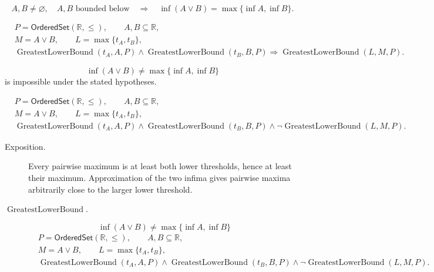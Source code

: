 \begin{remark*}
\[
A,B\neq\varnothing,\quad A,B\text{ bounded below}
\quad\Longrightarrow\quad
\inf(A\vee B)=\max\{\inf A,\inf B\}.
\]
\end{remark*}

\begin{remark*}
\[
\begin{aligned}
&P=\mathsf{OrderedSet}(\mathbb{R},\leq),\qquad A,B\subseteq\mathbb{R},\\
&M=A\vee B,\qquad L=\max\{t_A,t_B\},\\
&\operatorname{GreatestLowerBound}(t_A,A,P)\land\operatorname{GreatestLowerBound}(t_B,B,P)
\Longrightarrow
\operatorname{GreatestLowerBound}(L,M,P).
\end{aligned}
\]
\end{remark*}

\begin{remark*}
\[
\inf(A\vee B)\neq\max\{\inf A,\inf B\}
\]
is impossible under the stated hypotheses.
\end{remark*}

\begin{remark*}
\[
\begin{aligned}
&P=\mathsf{OrderedSet}(\mathbb{R},\leq),\qquad A,B\subseteq\mathbb{R},\\
&M=A\vee B,\qquad L=\max\{t_A,t_B\},\\
&\operatorname{GreatestLowerBound}(t_A,A,P)\land\operatorname{GreatestLowerBound}(t_B,B,P)\land
\neg\operatorname{GreatestLowerBound}(L,M,P).
\end{aligned}
\]
\end{remark*}

\begin{remark*}
\begin{description}
\item[Exposition.]
Every pairwise maximum is at least both lower thresholds, hence at least their
maximum.  Approximation of the two infima gives pairwise maxima arbitrarily
close to the larger lower threshold.


  \item[\(\operatorname{GreatestLowerBound}.\)]
  \[
\inf(A\vee B)\neq\max\{\inf A,\inf B\}
\]
\[
\begin{aligned}
&P=\mathsf{OrderedSet}(\mathbb{R},\leq),\qquad A,B\subseteq\mathbb{R},\\
&M=A\vee B,\qquad L=\max\{t_A,t_B\},\\
&\operatorname{GreatestLowerBound}(t_A,A,P)\land\operatorname{GreatestLowerBound}(t_B,B,P)\land
\neg\operatorname{GreatestLowerBound}(L,M,P).
\end{aligned}
\]
\end{description}
\end{remark*}

